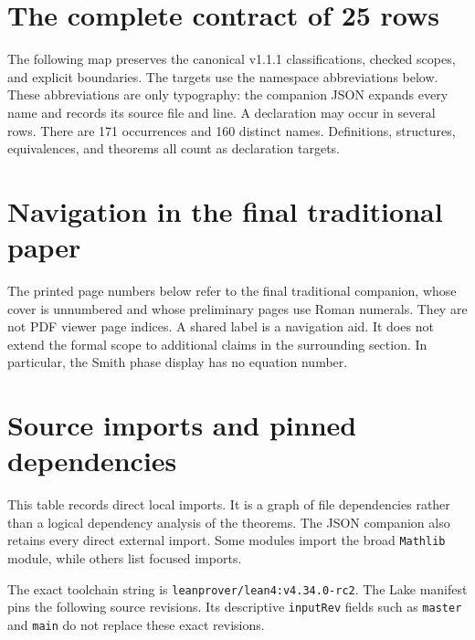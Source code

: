 \documentclass[11pt,a4paper]{article}
\newcommand{\code}[1]{\nolinkurl{#1}}
\begin{document}
\KomorebiCover
{}


\tableofcontents
\clearpage
{}






\clearpage
\section{The complete contract of 25 rows}\label{sec:map}
The following map preserves the canonical v1.1.1 classifications, checked scopes, and explicit boundaries. The targets use the namespace abbreviations below. These abbreviations are only typography: the companion JSON expands every name and records its source file and line. A declaration may occur in several rows. There are 171 occurrences and 160 distinct names. Definitions, structures, equivalences, and theorems all count as declaration targets.


\clearpage
\appendix
\section{Navigation in the final traditional paper}\label{app:crosswalk}
The printed page numbers below refer to the final traditional companion, whose cover is unnumbered and whose preliminary pages use Roman numerals. They are not PDF viewer page indices. A shared label is a navigation aid. It does not extend the formal scope to additional claims in the surrounding section. In particular, the Smith phase display has no equation number.

\section{Source imports and pinned dependencies}\label{app:imports}
This table records direct local imports. It is a graph of file dependencies rather than a logical dependency analysis of the theorems. The JSON companion also retains every direct external import. Some modules import the broad \code{Mathlib} module, while others list focused imports.

The exact toolchain string is \code{leanprover/lean4:v4.34.0-rc2}. The Lake manifest pins the following source revisions. Its descriptive \code{inputRev} fields such as \code{master} and \code{main} do not replace these exact revisions.

\end{document}
